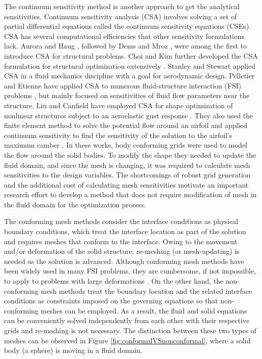 \documentclass[12pt]{aiaa-pretty}
\begin{document}
The continuum sensitivity method is another approach to get the analytical sensitivities. Continuum sensitivity analysis (CSA) involves solving a set of partial differential equations called the continuum sensitivity equations (CSEs). CSA has several computational efficiencies that other sensitivity formulations lack. Aurora and Haug \cite{Arora}, followed by Dems and Mroz \cite{Dems-Mroz}, were among the first to introduce CSA for structural problems. Choi and Kim further developed the CSA formulation for structural optimization extensively \cite{choi2005structural}. Stanley and Stewart \cite{stanley2002design} applied CSA in a fluid mechanics discipline with a goal for aerodynamic design. Pelletier and Etienne have applied CSA to numerous fluid-structure interaction (FSI) problems \cite{etienne2005general}, but mainly focused on sensitivities of fluid flow parameters near the structure. Liu and Canfield have employed CSA for shape optimization of nonlinear structures subject to an aeroelastic gust response \cite{liu2013equivalence}. They also used the finite element method to solve the potential flow around an airfoil and applied continuum sensitivity to find the sensitivity of the solution to the airfoil's maximum camber \cite{liu2013boundary}. In these works, body conforming grids were used to model the flow around the solid bodies.  To modify the shape they needed to update the fluid domain, and since the mesh is changing, it was required to calculate mesh sensitivities to the design variables. The shortcomings of robust grid generation and the additional cost of calculating mesh sensitivities motivate an important research effort to develop a method that does not require modification of mesh in the fluid domain for the optimization process.

The conforming mesh methods consider the interface conditions as physical boundary conditions, which treat the interface location as part of the solution and requires meshes that conform to the interface. Owing to the movement and/or deformation of the solid structure, re-meshing (or mesh-updating) is needed as the solution is advanced. Although conforming mesh methods have been widely used in many FSI problems, they are cumbersome, if not impossible, to apply to problems with large deformations \cite{sahin2009arbitrary}. On the other hand, the non-conforming mesh methods treat the boundary location and the related interface conditions as constraints imposed on the governing equations so that non-conforming meshes can be employed. As a result, the fluid and solid equations can be conveniently solved independently from each other with their respective grids and re-meshing is not necessary. The distinction between these two types of meshes can be observed in Figure \ref{fig:conformalVSnonconformal}, where a solid body (a sphere) is moving in a fluid domain.
\end{document}
